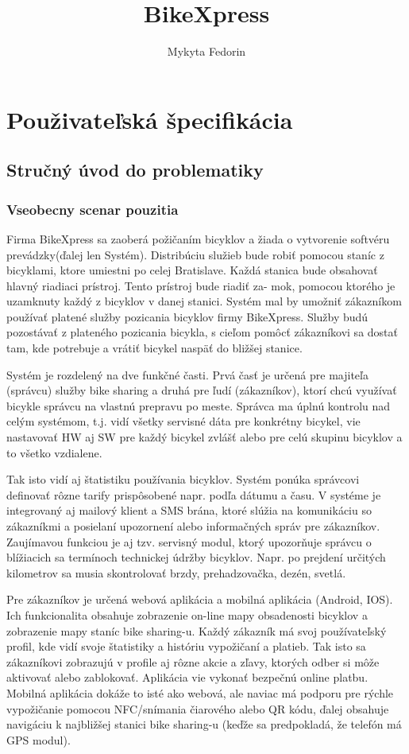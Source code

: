 \documentclass[12pt]{report}
\author{Mykyta Fedorin}
\title{BikeXpress}
\date{}
\begin{document}
\maketitle

\chapter{Použivateľská špecifikácia}
\section{Stručný úvod do problematiky}
\subsection{Vseobecny scenar pouzitia}

Firma BikeXpress sa zaoberá požičaním bicyklov a žiada o vytvorenie softvéru prevádzky(ďalej
len Systém). Distribúciu služieb bude robiť pomocou staníc z bicyklami, ktore umiestni po celej
Bratislave. Každá stanica bude obsahovať hlavný riadiaci prístroj. Tento prístroj bude riadiť za-
mok, pomocou ktorého je uzamknuty každý z bicyklov v danej stanici. Systém mal by umožniť
zákazníkom používať platené služby pozicania bicyklov firmy BikeXpress. Služby budú pozostávať
z plateného pozicania bicykla, s cieľom pomôcť zákazníkovi sa dostať tam, kde potrebuje a vrátiť
bicykel naspäť do bližšej stanice.

Systém je rozdelený na dve funkčné časti. Prvá časť je určená pre majiteľa (správcu) služby bike
sharing a druhá pre ľudí (zákazníkov), ktorí chcú využívať bicykle správcu na vlastnú prepravu po
meste. Správca ma úplnú kontrolu nad celým systémom, t.j. vidí všetky servisné dáta pre konkrétny
bicykel, vie nastavovať HW aj SW pre každý bicykel zvlášť alebo pre celú skupinu bicyklov a to všetko
vzdialene. 

Tak isto vidí aj štatistiku používania bicyklov. Systém ponúka správcovi definovať rôzne
tarify prispôsobené napr. podľa dátumu a času. V systéme je integrovaný aj mailový klient a SMS brána,
ktoré slúžia na komunikáciu so zákazníkmi a posielaní upozornení alebo informačných správ pre
zákazníkov. Zaujímavou funkciou je aj tzv. servisný modul, ktorý upozorňuje správcu o blížiacich sa
termínoch technickej údržby bicyklov. Napr. po prejdení určitých kilometrov sa musia skontrolovať
brzdy, prehadzovačka, dezén, svetlá. 

Pre zákazníkov je určená webová aplikácia a mobilná aplikácia
(Android, IOS). Ich funkcionalita obsahuje zobrazenie on-line mapy obsadenosti bicyklov a zobrazenie
mapy staníc bike sharing-u. Každý zákazník má svoj používateľský profil, kde vidí svoje štatistiky
a históriu vypožičaní a platieb. Tak isto sa zákazníkovi zobrazujú v profile aj rôzne akcie a zľavy,
ktorých odber si môže aktivovať alebo zablokovať. Aplikácia vie vykonať bezpečnú online platbu.
Mobilná aplikácia dokáže to isté ako webová, ale naviac má podporu pre rýchle vypožičanie pomocou
NFC/snímania čiarového alebo QR kódu, ďalej obsahuje navigáciu k najbližšej stanici bike sharing-u
(keďže sa predpokladá, že telefón má GPS modul).
\end{document}
